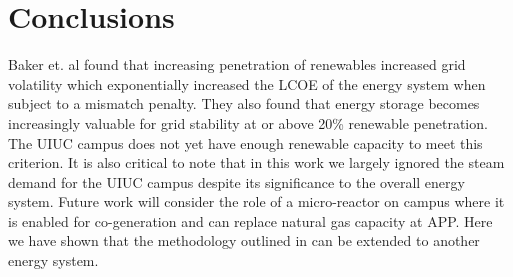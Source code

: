 \section{Conclusions}

Baker et. al found that increasing penetration of renewables increased grid volatility which exponentially increased the LCOE of the energy system when subject to a mismatch penalty. They also found that energy storage becomes increasingly valuable for grid stability at or above 20\% renewable penetration. The UIUC campus does not yet have enough renewable capacity to meet this criterion. It is also critical to note that in this work we largely ignored the steam demand for the UIUC campus despite its significance to the overall energy system. Future work will consider the role of a micro-reactor on campus where it is enabled for co-generation and can replace natural gas capacity at APP. Here we have shown that the methodology outlined in \cite{baker_optimal_2018} can be extended to another energy system. 